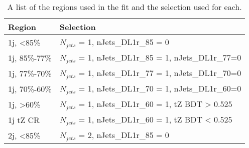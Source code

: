 \begin{table}[h]
\centering
\caption{A list of the regions used in the fit and the selection used for each.}
\begin{tabular}{l|l}
\hline\hline
Region & Selection            \\
\hline
\hline
1j, <85\%       & $N_{jets}$ = 1, nJets\_DL1r\_85 = 0            \\
1j, 85\%-77\%   & $N_{jets}$ = 1, nJets\_DL1r\_85 = 1, nJets\_DL1r\_77=0                     \\
1j, 77\%-70\%   & $N_{jets}$ = 1, nJets\_DL1r\_77 = 1, nJets\_DL1r\_70=0                     \\
1j, 70\%-60\%   & $N_{jets}$ = 1, nJets\_DL1r\_70 = 1, nJets\_DL1r\_60=0                      \\
1j, >60\%       & $N_{jets}$ = 1, nJets\_DL1r\_60 = 1, tZ BDT > 0.525 \\
1j tZ CR        & $N_{jets}$ = 1, nJets\_DL1r\_60 = 1, tZ BDT < 0.525 \\
2j, <85\%       & $N_{jets}$ = 2, nJets\_DL1r\_85 = 0                    \\

\end{tabular}
\end{table}
